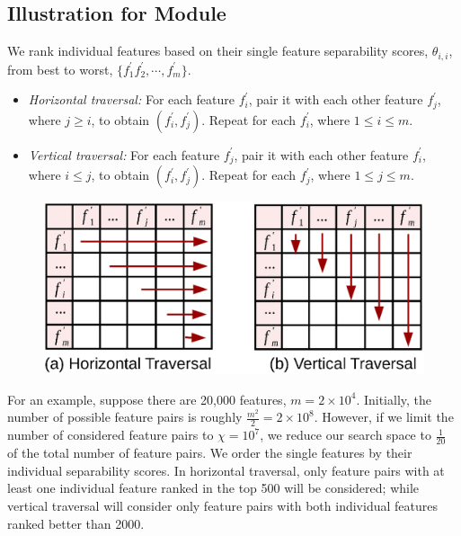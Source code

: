 \subsection{Illustration for \traversal Module}\label{appF:traversal}
We rank individual features based on their single feature separability scores, $\theta_{i,i}$, from best to worst, $\{f_1^{'} f_2^{'},\cdots,f_m^{'}\}$.
\begin{itemize}
 \item \emph{Horizontal traversal:} For each feature $f_i^{'}$, pair it with each other feature $f_j^{'}$, where $j \geq i$, to obtain $(f_i^{'},f_j^{'})$. Repeat for each $f_i^{'}$, where $1 \leq i\leq m$.
 \item \emph{Vertical traversal:} For each feature $f_j^{'}$, pair it with each other feature $f_i^{'}$, where $i \leq j$, to obtain $(f_i^{'},f_j^{'})$. Repeat for each $f_j^{'}$, where $1 \leq j\leq m$.
\end{itemize}

\begin{figure}[!htb]
 \centering
 \vspace{-5mm}
 \includegraphics[width=0.7\linewidth]{fig/traversal.eps}
\vspace{-5mm}
\label{fig:traversal}
\end{figure}

For an example, suppose there are 20,000 features, $m=2\times 10^4$. Initially, the number of possible feature pairs is roughly $\frac{m^2}{2}=2\times 10^8$. However, if we limit the number of considered feature pairs to $\chi=10^7$, we reduce our search space to $\frac{1}{20}$ of the total number of feature pairs. We order the single features by their individual separability scores. In horizontal traversal, only feature pairs with at least one individual feature ranked in the top 500 will be considered; while vertical traversal will consider only feature pairs with both individual features ranked better than 2000.


